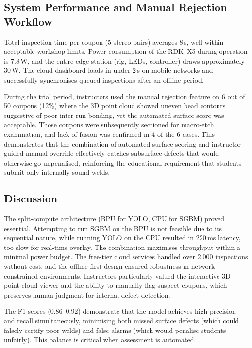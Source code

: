 \documentclass[12pt,a4paper]{article}
\begin{document}
\subsection{System Performance and Manual Rejection Workflow}

Total inspection time per coupon (5 stereo pairs) averages 8\,s, well within acceptable workshop limits.
Power consumption of the RDK~X5 during operation is 7.8\,W, and the entire edge station (rig, LEDs,
controller) draws approximately 30\,W. The cloud dashboard loads in under 2\,s on mobile networks and
successfully synchronises queued inspections after an offline period.

During the trial period, instructors used the manual rejection feature on 6 out of 50 coupons (12\%) where
the 3D point cloud showed uneven bead contours suggestive of poor inter-run bonding, yet the automated
surface score was acceptable. Those coupons were subsequently sectioned for macro-etch examination, and lack
of fusion was confirmed in 4 of the 6 cases. This demonstrates that the combination of automated surface
scoring and instructor-guided manual override effectively catches subsurface defects that would otherwise go
unpenalised, reinforcing the educational requirement that students submit only internally sound welds.

\subsection{Discussion}

The split-compute architecture (BPU for YOLO, CPU for SGBM) proved essential. Attempting to run SGBM on the
BPU is not feasible due to its sequential nature, while running YOLO on the CPU resulted in 220\,ms latency,
too slow for real-time overlay. The combination maximises throughput within a minimal power budget. The
free-tier cloud services handled over 2{,}000 inspections without cost, and the offline-first design ensured
robustness in network-constrained environments. Instructors particularly valued the interactive 3D
point-cloud viewer and the ability to manually flag suspect coupons, which preserves human judgment for
internal defect detection.

The F1 scores (0.86--0.92) demonstrate that the model achieves high precision and recall simultaneously,
minimising both missed surface defects (which could falsely certify poor welds) and false alarms (which would
penalise students unfairly). This balance is critical when assessment is automated.
\end{document}
